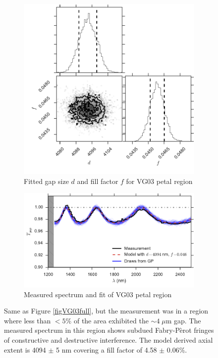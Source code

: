 \documentclass[osajnl,preprint,showpacs,superscriptaddress,12pt]{revtex4-1} %
\begin{document}
\begin{figure}[htbp]
        \centering
        \begin{subfigure}[b]{0.5\textwidth}
              \includegraphics[width=\textwidth]{figs/VG03p2_corner.pdf}
              \caption{Fitted gap size $d$ and fill factor $f$ for VG03 petal region}
		\label{figVG03p2_corner}
        \end{subfigure}
	
        \begin{subfigure}[b]{0.5\textwidth}
                \includegraphics[width=\textwidth]{figs/VG03_f045.pdf}
                \caption{Measured spectrum and fit of VG03 petal region}
                \label{figVG03_f045}
        \end{subfigure}
\caption{ Same as Figure \ref{figVG03full}, but the measurement was in a region where less than $<5\%$ of the area exhibited the $\sim4\; \mu$m gap.  The measured spectrum in this region shows subdued Fabry-P\`erot fringes of constructive and destructive interference. The model derived axial extent is 4094 $\pm$ 5 nm covering a fill factor of 4.58 $\pm$ 0.06$\%$. \label{figVG03part}}
\end{figure}
\end{document}
